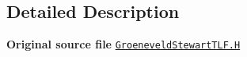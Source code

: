 \subsection{Detailed Description}
{\bfseries Original source file} \href{../../../home/carlo/data/GeN-Foam/GeN-Foam_ffn/GeN-Foam/GeN-Foam/classes/thermalHydraulics/src/physicsModels/heatTransferModels/FSHeatTransferCoefficientModels/subModels/CHFModels/LeidenFrostTemperatureModels/GroeneveldStewart/GroeneveldStewartTLF.H}{\tt Groeneveld\+Stewart\+T\+L\+F.\+H} 